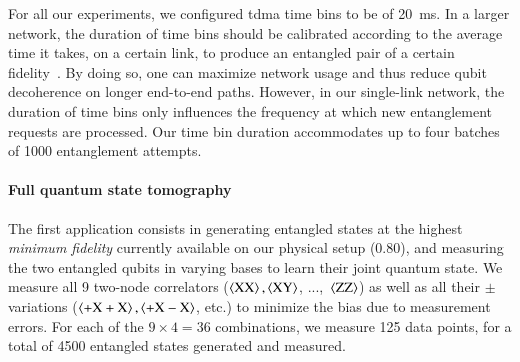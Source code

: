 For all our experiments, we configured \acrshort{tdma} time bins to be of \qty{20}{\ms}. In a larger
network, the duration of time bins should be calibrated according to the average time it takes, on a
certain link, to produce an entangled pair of a certain fidelity~\cite{skrzypczyk_2021_arch}. By
doing so, one can maximize network usage and thus reduce qubit decoherence on longer end-to-end
paths. However, in our single-link network, the duration of time bins only influences the frequency
at which new entanglement requests are processed. Our time bin duration accommodates up to four
batches of \num{1000} entanglement attempts.

\paragraph{Full quantum state tomography}

The first application consists in generating entangled states at the highest \emph{minimum fidelity}
currently available on our physical setup (\num{0.80}), and measuring the two entangled qubits in
varying bases to learn their joint quantum state. We measure all \num{9} two-node correlators
($\braket{\mathrm{XX}}, \braket{\mathrm{XY}}$, ...,~$\braket{\mathrm{ZZ}}$) as well as all their
$\pm$ variations ($\braket{\mathrm{+X+X}}, \braket{\mathrm{+X-X}}$, etc.) to minimize the bias due
to measurement errors. For each of the $9 \times 4 = 36$ combinations, we measure \num{125} data
points, for a total of \num{4500} entangled states generated and measured.


